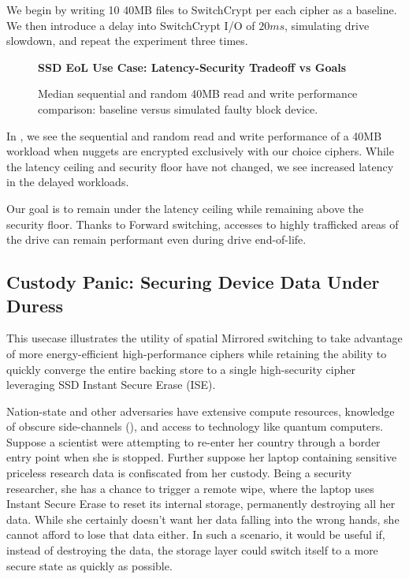 We begin by writing 10 40MB files to SwitchCrypt per each cipher as a baseline.
We then introduce a delay into SwitchCrypt I/O of $20ms$, simulating drive
slowdown, and repeat the experiment three times.

\begin{figure}[ht] \textbf{SSD EoL Use Case: Latency-Security Tradeoff vs
   Goals}\par\medskip
   {} \caption{Median sequential and
   random 40MB read and write performance comparison: baseline versus simulated
   faulty block device.}
  \label{fig:usecase-eol-tradeoff}
\end{figure}

In , we see the sequential and random read and
write performance of a 40MB workload when nuggets are encrypted exclusively with
our choice ciphers. While the latency ceiling and security floor have not
changed, we see increased latency in the delayed workloads.

Our goal is to remain under the latency ceiling while remaining above the
security floor. Thanks to Forward switching, accesses to highly trafficked areas
of the drive can remain performant even during drive end-of-life.

\subsection{Custody Panic: Securing Device Data Under Duress}\label{subsec:uc4}

This usecase illustrates the utility of spatial Mirrored switching to take
advantage of more energy-efficient high-performance ciphers while retaining the
ability to quickly converge the entire backing store to a single high-security
cipher leveraging SSD Instant Secure Erase (ISE).

Nation-state and other adversaries have extensive compute resources, knowledge
of obscure side-channels (), and access to
technology like quantum computers. Suppose a scientist were attempting to
re-enter her country through a border entry point when she is stopped. Further
suppose her laptop containing sensitive priceless research data is confiscated
from her custody. Being a security researcher, she has a chance to trigger a
remote wipe, where the laptop uses Instant Secure Erase to reset its internal
storage, permanently destroying all her data. While she certainly doesn't want
her data falling into the wrong hands, she cannot afford to lose that data
either. In such a scenario, it would be useful if, instead of destroying the
data, the storage layer could switch itself to a more secure state as quickly as
possible.

